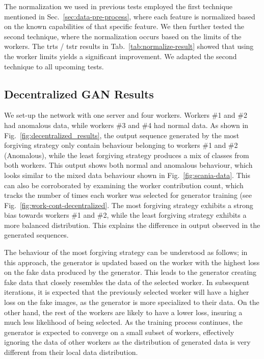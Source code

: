 
%
The normalization we used in previous tests employed the first technique mentioned in Sec.~\ref{sec:data-pre-process}, where each feature is normalized based on the known capabilities of that specific feature. We then further tested the second technique, where the normalization occurs based on the limits of the workers. The \gls*{trts} / \gls*{tstr} results in Tab.~\ref{tab:normalize-result} showed that using the worker limits yields a significant improvement. We adapted the second technique to all upcoming tests.



\subsection{Decentralized GAN Results}
%
We set-up the network with one server and four workers. Workers \#1 and \#2 had anomalous data, while workers \#3 and \#4 had normal data.
As shown in Fig.~\ref{fig:decentralized_results}, the output sequence generated by the most forgiving strategy only contain behaviour belonging to workers \#1 and \#2 (Anomalous), while the least forgiving strategy produces a mix of classes from both workers. This output shows both normal and anomalous behaviour, which looks similar to the mixed data behaviour shown in Fig.~\ref{fig:scania-data}. This can also be corroborated by examining the worker contribution count, which tracks the number of times each worker was selected for generator training (see Fig.~\ref{fig:work-cont-decentralized}. The most forgiving strategy exhibits a strong bias towards workers \#1 and \#2, while the least forgiving strategy exhibits a more balanced distribution. This explains the difference in output observed in the generated sequences.



The behaviour of the most forgiving strategy can be understood as follows; in this approach, the generator is updated based on the worker with the highest loss on the fake data produced by the generator. This leads to the generator creating fake data that closely resembles the data of the selected worker. In subsequent iterations, it is expected that the previously selected worker will have a higher loss on the fake images, as the generator is more specialized to their data. On the other hand, the rest of the workers are likely to have a lower loss, insuring a much less likelihood of being selected. As the training process continues, the generator is expected to converge on a small subset of workers, effectively ignoring the data of other workers as the distribution of generated data is very different from their local data distribution. 


